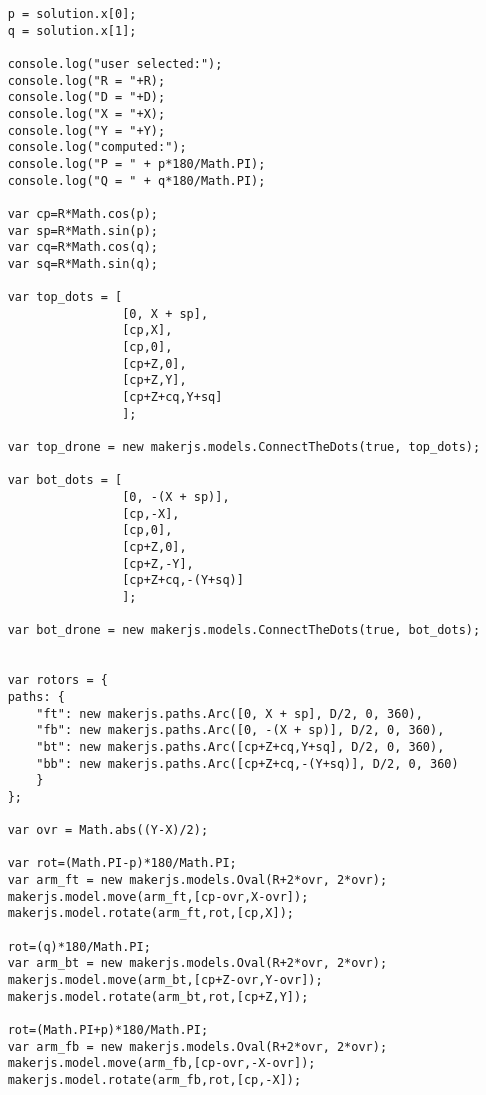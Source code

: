 \documentclass[11pt]{article}
\begin{document}
\begin{lstlisting}
    p = solution.x[0];
    q = solution.x[1];
                                    
    console.log("user selected:");
    console.log("R = "+R);
    console.log("D = "+D);
    console.log("X = "+X);
    console.log("Y = "+Y);
    console.log("computed:");
    console.log("P = " + p*180/Math.PI);
    console.log("Q = " + q*180/Math.PI);
    
    var cp=R*Math.cos(p);
    var sp=R*Math.sin(p);
    var cq=R*Math.cos(q);
    var sq=R*Math.sin(q);
    
    var top_dots = [
                    [0, X + sp],
                    [cp,X],
                    [cp,0],
                    [cp+Z,0],
                    [cp+Z,Y],
                    [cp+Z+cq,Y+sq]
                    ];
    
    var top_drone = new makerjs.models.ConnectTheDots(true, top_dots);
    
    var bot_dots = [
                    [0, -(X + sp)],
                    [cp,-X],
                    [cp,0],
                    [cp+Z,0],
                    [cp+Z,-Y],
                    [cp+Z+cq,-(Y+sq)]
                    ];
    
    var bot_drone = new makerjs.models.ConnectTheDots(true, bot_dots);
    
    
    var rotors = {
    paths: {
        "ft": new makerjs.paths.Arc([0, X + sp], D/2, 0, 360),
        "fb": new makerjs.paths.Arc([0, -(X + sp)], D/2, 0, 360),
        "bt": new makerjs.paths.Arc([cp+Z+cq,Y+sq], D/2, 0, 360),
        "bb": new makerjs.paths.Arc([cp+Z+cq,-(Y+sq)], D/2, 0, 360)
        }
    };
                                                                                                                        
    var ovr = Math.abs((Y-X)/2);
                       
    var rot=(Math.PI-p)*180/Math.PI;
    var arm_ft = new makerjs.models.Oval(R+2*ovr, 2*ovr);
    makerjs.model.move(arm_ft,[cp-ovr,X-ovr]);
    makerjs.model.rotate(arm_ft,rot,[cp,X]);
                                        
    rot=(q)*180/Math.PI;
    var arm_bt = new makerjs.models.Oval(R+2*ovr, 2*ovr);
    makerjs.model.move(arm_bt,[cp+Z-ovr,Y-ovr]);
    makerjs.model.rotate(arm_bt,rot,[cp+Z,Y]);
                                
    rot=(Math.PI+p)*180/Math.PI;
    var arm_fb = new makerjs.models.Oval(R+2*ovr, 2*ovr);
    makerjs.model.move(arm_fb,[cp-ovr,-X-ovr]);
    makerjs.model.rotate(arm_fb,rot,[cp,-X]);
                        

\end{lstlisting}
\end{document}

